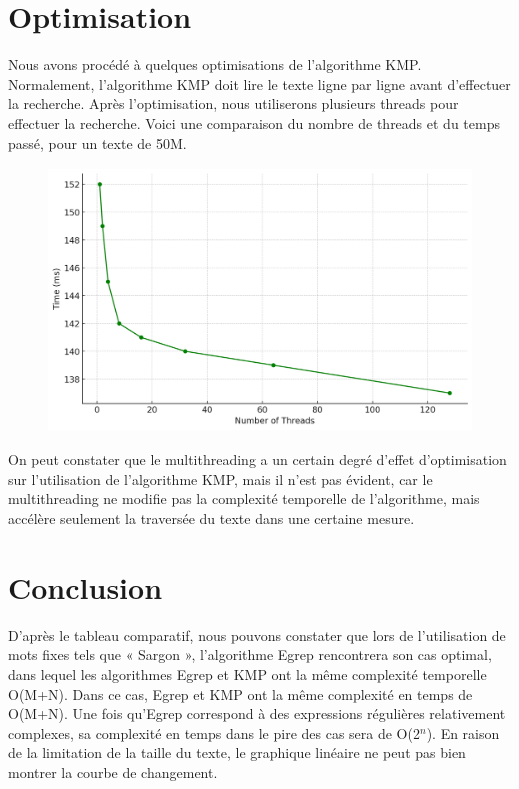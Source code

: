 \documentclass[11pt,english]{article}
\begin{document}
\section{Optimisation}

\indent

Nous avons procédé à quelques optimisations de l'algorithme KMP. Normalement, l'algorithme KMP doit lire le texte ligne par ligne avant d'effectuer la recherche. Après l'optimisation, nous utiliserons plusieurs threads pour effectuer la recherche. Voici une comparaison du nombre de threads et du temps passé, pour un texte de 50M.

\begin{figure}[htbp]
    \begin{center}
        \includegraphics[height=7cm]{./src/Compare3.png}
    \end{center}
\end{figure}

\pagebreak

\indent On peut constater que le multithreading a un certain degré d'effet d'optimisation sur l'utilisation de l'algorithme KMP, mais il n'est pas évident, car le multithreading ne modifie pas la complexité temporelle de l'algorithme, mais accélère seulement la traversée du texte dans une certaine mesure.

\section{Conclusion}

\indent

D'après le tableau comparatif, nous pouvons constater que lors de l'utilisation de mots fixes tels que « Sargon », l'algorithme Egrep rencontrera son cas optimal, dans lequel les algorithmes Egrep et KMP ont la même complexité temporelle O(M+N). Dans ce cas, Egrep et KMP ont la même complexité en temps de O(M+N). Une fois qu'Egrep correspond à des expressions régulières relativement complexes, sa complexité en temps dans le pire des cas sera de O(2$^{n}$). En raison de la limitation de la taille du texte, le graphique linéaire ne peut pas bien montrer la courbe de changement.
\end{document}
